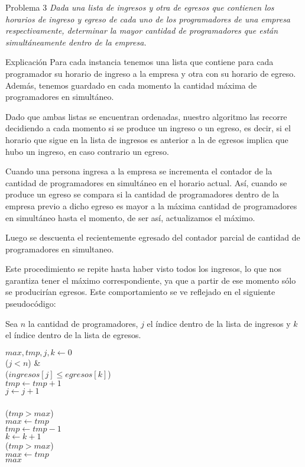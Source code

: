\begin{section}{Problema 3}
	\textit{Dada una lista de ingresos y otra de egresos que contienen los horarios de ingreso y egreso de cada uno de los programadores de una empresa respectivamente, determinar la mayor cantidad de programadores que están simultáneamente dentro de la empresa.}

	\begin{subsection}{Explicación}
		Para cada instancia tenemos una lista que contiene para cada programador su horario de ingreso a la empresa y otra con su horario de egreso. Además, tenemos guardado en cada momento la cantidad máxima de programadores en simultáneo.

Dado que ambas listas se encuentran ordenadas, nuestro algoritmo las recorre decidiendo a cada momento si se produce un ingreso o un egreso, es decir, si el horario que sigue en la lista de ingresos es anterior a la de egresos implica que hubo un ingreso, en caso contrario un egreso.

Cuando una persona ingresa a la empresa se incrementa el contador de la cantidad de programadores en simultáneo en el horario actual. Así, cuando se produce un egreso se compara si la cantidad de programadores dentro de la empresa previo a dicho egreso es mayor a la máxima cantidad de programadores en simultáneo hasta el momento, de ser así, actualizamos el máximo.

Luego se descuenta el recientemente egresado del contador parcial de cantidad de programadores en simultaneo.

Este procedimiento se repite hasta haber visto todos los ingresos, lo que nos garantiza tener el máximo correspondiente, ya que a partir de ese momento sólo se producirían egresos. Este comportamiento se ve reflejado en el siguiente pseudocódigo:

		\pagebreak
		Sea $n$ la cantidad de programadores, $j$ el índice dentro de la lista de ingresos y $k$ el índice dentro de la lista de egresos.
		
		\vspace{0.5cm}
		\begin{pseudo}
				\tab $max,tmp,j,k \leftarrow 0$ \\
				\tab \WHILE($j< n$) &   \\
				\tab \tab \IF($ingresos[j]\leq egresos[k]$) \\
				\tab \tab \tab $tmp \leftarrow tmp+1$ \\
				\tab \tab \tab $j \leftarrow j+1$ \\
				\tab \tab \ELSE \\
				\tab \tab \tab \IF($tmp>max$) \\
				\tab \tab \tab \tab $max \leftarrow tmp$ \\
				\tab \tab \tab $tmp \leftarrow tmp - 1$ \\
				\tab \tab \tab $k \leftarrow k+1$ \\
				\tab \IF($tmp>max$) \\
				\tab \tab $max \leftarrow tmp$ \\
				\tab \RET $max$
		\end{pseudo}





\end{subsection}
\end{section}
